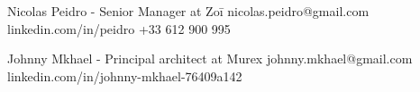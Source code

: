 

\cvref
    {Nicolas Peidro - Senior Manager at Zoī}
    {nicolas.peidro@gmail.com}
    {linkedin.com/in/peidro}
    {+33 612 900 995}

\divider

\cvref
    {Johnny Mkhael - Principal architect at Murex}
    {johnny.mkhael@gmail.com}
    {linkedin.com/in/johnny-mkhael-76409a142}
    {}